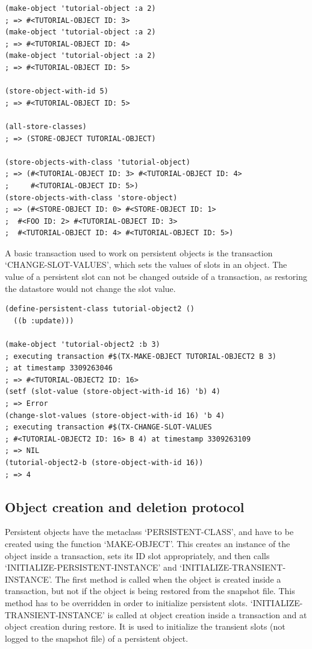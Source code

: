 \begin{Verbatim}[fontsize=\small,frame=leftline,framerule=0.9mm,rulecolor=\color{gray},framesep=5.1mm,xleftmargin=5mm,fontfamily=cmtt]
(make-object 'tutorial-object :a 2)
; => #<TUTORIAL-OBJECT ID: 3>
(make-object 'tutorial-object :a 2)
; => #<TUTORIAL-OBJECT ID: 4>
(make-object 'tutorial-object :a 2)
; => #<TUTORIAL-OBJECT ID: 5>

(store-object-with-id 5)
; => #<TUTORIAL-OBJECT ID: 5>

(all-store-classes)
; => (STORE-OBJECT TUTORIAL-OBJECT)

(store-objects-with-class 'tutorial-object)
; => (#<TUTORIAL-OBJECT ID: 3> #<TUTORIAL-OBJECT ID: 4>
;     #<TUTORIAL-OBJECT ID: 5>)
(store-objects-with-class 'store-object)
; => (#<STORE-OBJECT ID: 0> #<STORE-OBJECT ID: 1>
;  #<FOO ID: 2> #<TUTORIAL-OBJECT ID: 3>
;  #<TUTORIAL-OBJECT ID: 4> #<TUTORIAL-OBJECT ID: 5>)
\end{Verbatim}
A basic transaction used to work on persistent objects is the
transaction `CHANGE-SLOT-VALUES', which sets the values of slots
in an object. The value of a persistent slot can not be changed
outside of a transaction, as restoring the datastore would not
change the slot value.

\begin{Verbatim}[fontsize=\small,frame=leftline,framerule=0.9mm,rulecolor=\color{gray},framesep=5.1mm,xleftmargin=5mm,fontfamily=cmtt]
(define-persistent-class tutorial-object2 ()
  ((b :update)))

(make-object 'tutorial-object2 :b 3)
; executing transaction #$(TX-MAKE-OBJECT TUTORIAL-OBJECT2 B 3)
; at timestamp 3309263046
; => #<TUTORIAL-OBJECT2 ID: 16>
(setf (slot-value (store-object-with-id 16) 'b) 4)
; => Error
(change-slot-values (store-object-with-id 16) 'b 4)
; executing transaction #$(TX-CHANGE-SLOT-VALUES
; #<TUTORIAL-OBJECT2 ID: 16> B 4) at timestamp 3309263109
; => NIL
(tutorial-object2-b (store-object-with-id 16))
; => 4
\end{Verbatim}


\subsection{ Object creation and deletion protocol}
Persistent objects have the metaclass `PERSISTENT-CLASS', and have
to be created using the function `MAKE-OBJECT'. This creates an
instance of the object inside a transaction, sets its ID slot
appropriately, and then calls `INITIALIZE-PERSISTENT-INSTANCE' and
`INITIALIZE-TRANSIENT-INSTANCE'. The first method is called when
the object is created inside a transaction, but not if the object
is being restored from the snapshot file. This method has to be
overridden in order to initialize persistent
slots. `INITIALIZE-TRANSIENT-INSTANCE' is called at object
creation inside a transaction and at object creation during
restore. It is used to initialize the transient slots (not logged
to the snapshot file) of a persistent object.

